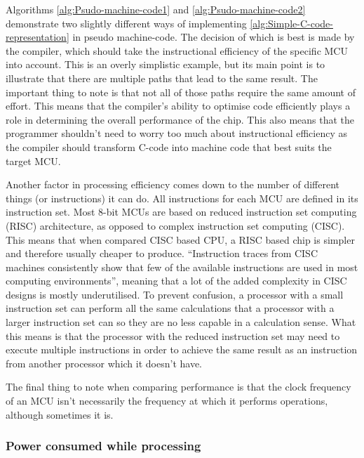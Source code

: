 Algorithms \ref{alg:Psudo-machine-code1} and \ref{alg:Psudo-machine-code2}
demonstrate two slightly different ways of implementing \ref{alg:Simple-C-code-representation}
in pseudo machine-code. The decision of which is best is made by the
compiler, which should take the instructional efficiency of the specific
MCU into account. This is an overly simplistic example, but its main
point is to illustrate that there are multiple paths that lead to
the same result. The important thing to note is that not all of those
paths require the same amount of effort. This means that the compiler's
ability to optimise code efficiently plays a role in determining the
overall performance of the chip. This also means that the programmer
shouldn't need to worry too much about instructional efficiency as
the compiler should transform C-code into machine code that best suits
the target MCU.

Another factor in processing efficiency comes down to the number of
different things (or instructions) it can do. All instructions for
each MCU are defined in its instruction set. Most 8-bit MCUs are based
on reduced instruction set computing (RISC) architecture, as opposed
to complex instruction set computing (CISC). This means that when
compared CISC based CPU, a RISC based chip is simpler and therefore
usually cheaper to produce. ``Instruction traces from CISC machines
consistently show that few of the available instructions are used
in most computing environments''\cite{ComputerArch}, meaning that
a lot of the added complexity in CISC designs is mostly underutilised.
To prevent confusion, a processor with a small instruction set can
perform all the same calculations that a processor with a larger instruction
set can so they are no less capable in a calculation sense. What this
means is that the processor with the reduced instruction set may need
to execute multiple instructions in order to achieve the same result
as an instruction from another processor which it doesn't have.

The final thing to note when comparing performance is that the clock
frequency of an MCU isn't necessarily the frequency at which it performs
operations, although sometimes it is.


\subsubsection{Power consumed while processing}

